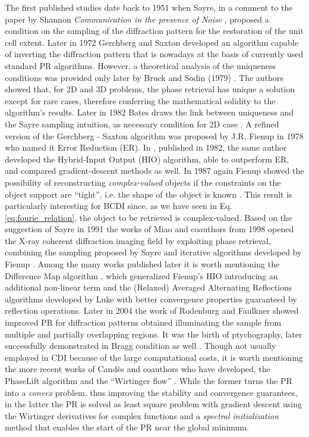 The first published studies date back to 1951 when Sayre, in a comment \cite{Sayre_1952} to the paper by 
Shannon \textit{Communication in the presence of Noise} \cite{Shannon_1949}, proposed a condition on the sampling of the diffraction 
pattern for the restoration of the unit cell extent. Later in 1972 Gerchberg and Saxton \cite{gerchberg1972} developed an 
algorithm capable of inverting the diffraction pattern that is nowadays at the basis of currently used standard PR algorithms. 
However, a theoretical analysis of the uniqueness conditions was provided only later by Bruck and Sodin (1979) \cite{BruckSodin1979}. 
The authors showed that, for 2D and 3D problems, the phase retrieval has unique a solution except for rare cases, therefore conferring the mathematical solidity to the algorithm's results. Later in 1982 Bates draws the link between uniqueness and 
the Sayre sampling intuition, as necessary condition for 2D case \cite{Bates1982}. A refined version of the Gerchberg - Saxton algorithm 
was proposed by J.R. Fienup in 1978 \cite{fienup_reconstruction_1978}
who named it Error Reduction (ER). In \cite{fienup_phase_1982}, published in 1982, the same author developed the Hybrid-Input Output (HIO) algorithm, 
able to outperform ER, and compared gradient-descent methods as well. In 1987 again Fienup showed the possibility of reconstructing 
\textit{complex-valued} objects if the constraints on the object support are ``tight'', i.e. the shape of the object 
is known \cite{Fienup1987}. This result is particularly interesting for BCDI since, as we have seen in Eq. \ref{eq:fourie_relation}, 
the object to be retrieved is complex-valued. 
Based on the suggestion of Sayre in 1991 \cite{sayre1991direct} the works of Miao and coauthors from 1998 
opened the X-ray coherent diffraction imaging field by exploiting phase retrieval, combining the sampling proposed by Sayre and
iterative algorithms developed by Fienup \cite{Miao1998, Miao1999, Miao2000}. Among the many works published later it is worth 
mentioning the Difference Map algorithm \cite{Elser2003}, which generalized Fienup's HIO introducing an additional 
non-linear term and the (Relaxed) Averaged Alternating Reflections algorithms developed by Luke \cite{AAR_2004, Luke_2004} 
with better convergence properties guaranteed by reflection operations. Later in 2004 the work of Rodenburg and Faulkner 
\cite{RodenburgFaulkner2004} showed improved
PR for diffraction patterns obtained illuminating the sample from multiple and partially overlapping regions. 
It was the birth of ptychography, later successfully demonstrated in Bragg condition as well \cite{Godard2011}. Though 
not usually employed in CDI because of the 
large computational costs, it is worth mentioning the more recent works of Cand{\`e}s and coauthors who have developed, 
the PhaseLift algorithm \cite{CandesStrohmerVoroninski2013} and the ``Wirtinger flow'' \cite{Wirtinger1927}. While the 
former turns the PR into a \textit{convex} problem, thus improving the stability and convergence guarantees, in the latter 
the PR is solved as least square problem with gradient descent using the Wirtinger derivatives for complex functions 
and a \textit{spectral initialization} method that enables the start of the PR near the global minimum.

